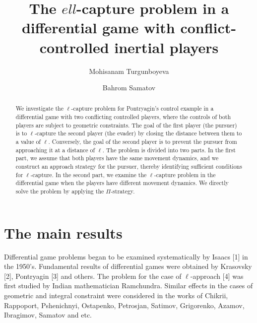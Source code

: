 \documentclass[12pt]{llncs}
\begin{document}
\fi

\title{The $ell$-capture problem in a differential game with conflict-controlled inertial players}

\author{Mohisanam Turgunboyeva  \and  Bahrom Samatov
  }

\maketitle

\begin{abstract}
We investigate the $\ell$-capture problem for Pontryagin's control example in a differential game with two conflicting controlled players, where the controls of both players are subject to geometric constraints. The goal of the first player (the pursuer) is to $\ell$-capture the second player (the evader) by closing the distance between them to a value of $\ell$. Conversely, the goal of the second player is to prevent the pursuer from approaching it at a distance of $\ell$. The problem is divided into two parts. In the first part, we assume that both players have the same movement dynamics, and we construct an approach strategy for the pursuer, thereby identifying sufficient conditions for $\ell$-capture. In the second part, we examine the $\ell$-capture problem in the differential game when the players have different movement dynamics. We directly solve the problem by applying the $\Pi$-strategy.


\end{abstract}


\section{The main results} %

Differential game problems began to be examined systematically by Isaacs [1] in the 1950's. Fundamental results of differential games were
obtained by Krasovsky [2], Pontryagin [3] and others. The problem for the case of $\ell$-approach [4] was first studied by Indian mathematician Ramchundra. Similar effects in the cases of geometric and integral constraint were considered in the works of Chikrii,
Rappoport, Pshenichnyi, Ostapenko, Petrosjan, Satimov, Grigorenko, Azamov, Ibragimov, Samatov and etc.
\end{document}
